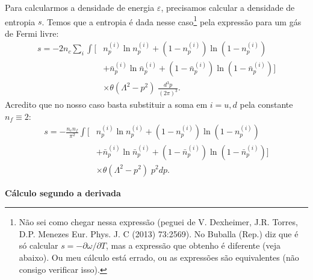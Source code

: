 Para calcularmos a densidade de energia $\varepsilon$, precisamos calcular a densidade de entropia $s$. Temos que a entropia é dada nesse caso\footnote{Não sei como chegar nessa expressão (peguei de V. Dexheimer, J.R. Torres, D.P. Menezes Eur. Phys. J. C (2013) 73:2569). No Buballa (Rep.) diz que é só calcular $s = -\partial\omega/\partial T$, mas a expressão que obtenho é diferente (veja abaixo). Ou meu cálculo está errado, ou as expressões são equivalentes (não consigo verificar isso).} pela expressão para um gás de Fermi livre:
\begin{equation}\label{Eq:Densidade_de_entropia}
\begin{split}
	s = -2 n_c \sum_i \int [&n_p^{(i)} \ln n_p^{(i)} + (1 - n_p^{(i)}) \ln(1-n_p^{(i)}) \\
	&+ \bar{n}_p^{(i)} \ln \bar{n}_p^{(i)} + (1-\bar{n}_p^{(i)})\ln(1-\bar{n}_p^{(i)})] \\
	&\times\theta(\Lambda^2 - p^2)\;\frac{d^3p}{(2\pi)^3}.
\end{split}
\end{equation}
%
Acredito que no nosso caso basta substituir a soma em $i = u, d$ pela constante $n_f \equiv 2$:
\begin{equation}
\begin{split}
	s = - \frac{n_c n_f}{\pi^2} \int [&n_p^{(i)} \ln n_p^{(i)} + (1 - n_p^{(i)}) \ln(1-n_p^{(i)}) \\
	&+ \bar{n}_p^{(i)} \ln \bar{n}_p^{(i)} + (1-\bar{n}_p^{(i)})\ln(1-\bar{n}_p^{(i)})] \\
	&\times\theta(\Lambda^2 - p^2) \; p^2 dp.
\end{split}
\end{equation}

\textbf{Cálculo segundo a derivada}

